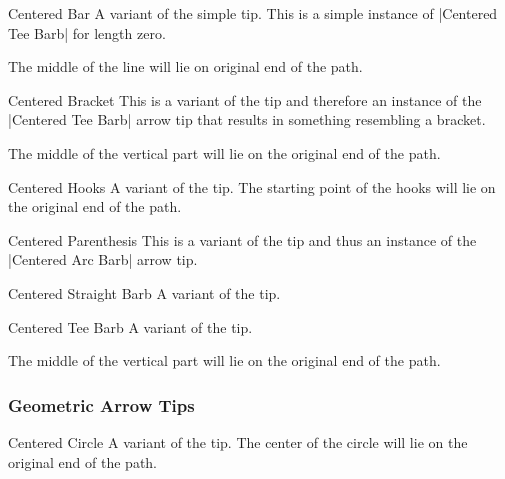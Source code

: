 \begin{multicols}{2}
\begin{arrowtipsimple}{Centered Bar}
    A variant of the simple  tip.
    This is a simple instance of |Centered Tee Barb| for length zero.
    
    The middle of the line will lie on original end of the path.
\end{arrowtipsimple}

\begin{arrowtipsimple}{Centered Bracket}
    This is a variant of the  tip and
    therefore an instance of the |Centered Tee Barb| arrow tip that results in something
    resembling a bracket.
    
    The middle of the vertical part will lie on the original end of the path.
\end{arrowtipsimple}

\begin{arrowtipsimple}{Centered Hooks}
    A variant of the  tip.
    The starting point of the hooks will lie on the original end of the path.
\end{arrowtipsimple}

\begin{arrowtipsimple}{Centered Parenthesis}
    This is a variant of the  tip and
    thus an instance of the |Centered Arc Barb| arrow tip.
\end{arrowtipsimple}

\begin{arrowtipsimple}{Centered Straight Barb}
    A variant of the  tip.
\end{arrowtipsimple}

\begin{arrowtipsimple}{Centered Tee Barb}
    A variant of the  tip.
    
    The middle of the vertical part will lie on the original end of the path.
\end{arrowtipsimple}

\subsubsection{Geometric Arrow Tips}
\begin{arrowtipsimple}{Centered Circle}
    A variant of the  tip.
    The center of the circle will lie on the original end of the path.
\end{arrowtipsimple}


\end{multicols}
